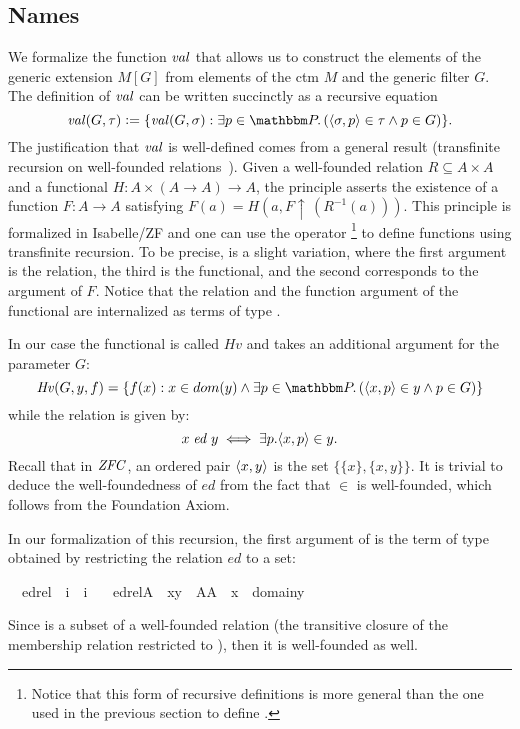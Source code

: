 \subsection{Names}
\label{sec:names}
We formalize the function $\operatorname{\mathit{val}}$ that allows us to
construct the elements of the generic extension $M[G]$ from elements
of the ctm $M$ and the generic filter $G$. The definition of $\operatorname{\mathit{val}}$
can be written succinctly as a recursive equation
%
\begin{equation}\label{eq:def-val}
\val(G,\tau)\defi \{\val(G,\sigma) : \exists p\in \PP.\,
(\lb\sigma,p\rb\in\tau \y p\in G)\}.
\end{equation}
%
The justification that $\operatorname{\mathit{val}}$ is well-defined comes from a general
result (transfinite recursion on well-founded
relations~\cite[p. 48]{kunen2011set}). Given a well-founded relation
$R \subseteq A \times A$ and a functional
$H : A \times (A \to A) \to A$, the principle asserts the existence of
a function $F : A \to A$ satisfying
$F(a) = H(a,F\uparrow\,(R^{-1}(a)))$. This principle is formalized in
Isabelle/ZF and one can use the operator \footnote{Notice
  that this form of recursive definitions is more general than the one
  used in the previous section to define
  .} to define functions using
transfinite recursion. To be precise,  is a slight variation, where the first argument is the
relation, the third is the functional, and the second corresponds to
the argument of $F$. Notice that the relation and the function argument
of the functional are internalized as terms of type .

In our case the functional is called $Hv$ and takes an additional argument for the
parameter $G$:
\[
  \mathit{Hv}(G,y,f) = \{f(x) : x \in dom(y) \y \exists p\in \PP.\,
(\lb x,p\rb\in y \y p\in G)\}
\]
while the relation is given by:
\[
x \mathrel{\mathit{ed}} y \iff \exists p . \langle x,p\rangle\in y.
\]
Recall that in $\mathit{ZFC}$, an ordered pair $\langle x,y \rangle$ is the set
$\{\{x\},\{x,y\}\}$. It is trivial to deduce the well-foundedness of
$\mathit{ed}$ from the fact that $\in$ is well-founded, which follows
from the Foundation Axiom.

In our formalization of this recursion,  the first argument of
 is the term of type   obtained by restricting the
relation $\mathit{ed}$ to  a set:
% 
\begin{isabelle}
\isamarkupfalse%
\isanewline
\ \ edrel\ {\isacharcolon}{\isacharcolon}\ {\isachardoublequoteopen}i\ {\isasymRightarrow}\ i{\isachardoublequoteclose}\ \isanewline
\ \ {\isachardoublequoteopen}edrel{\isacharparenleft}A{\isacharparenright}\ {\isacharequal}{\isacharequal}\ {\isacharbraceleft}{\isacharless}x{\isacharcomma}y{\isachargreater}\ {\isasymin}\ A{\isacharasterisk}A\ {\isachardot}\ x\ {\isasymin}\ domain{\isacharparenleft}y{\isacharparenright}{\isacharbraceright}{\isachardoublequoteclose}
\end{isabelle}
%
Since  is a subset of a  well-founded relation (the
transitive closure of the membership relation restricted to ),
then it is well-founded as well.

